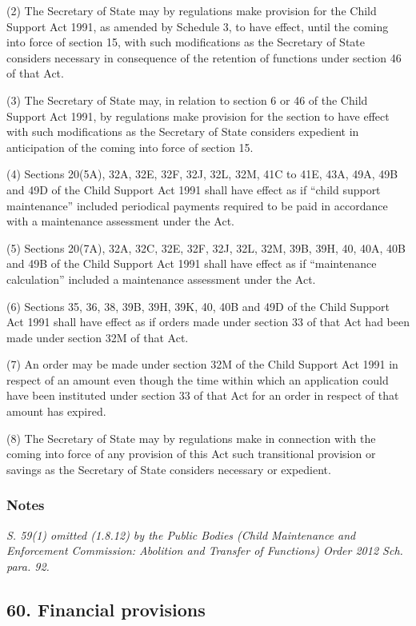 \documentclass[a4paper]{article}
\newcommand\amendment[1]{\subsubsection*{Notes}{\itshape\frenchspacing\footnotesize #1 \par}}
\begin{document}

(2) The Secretary of State may by regulations make provision for the Child Support Act 1991, as amended by Schedule 3, to have effect, until the coming into force of section 15, with such modifications as the Secretary of State considers necessary in consequence of the retention of functions under section 46 of that Act.

(3) The Secretary of State may, in relation to section 6 or 46 of the Child Support Act 1991, by regulations make provision for the section to have effect with such modifications as the Secretary of State considers expedient in anticipation of the coming into force of section 15.

(4) Sections 20(5A), 32A, 32E, 32F, 32J, 32L, 32M, 41C to 41E, 43A, 49A, 49B and 49D of the Child Support Act 1991 shall have effect as if “child support maintenance” included periodical payments required to be paid in accordance with a maintenance assessment under the Act.

(5) Sections 20(7A), 32A, 32C, 32E, 32F, 32J, 32L, 32M, 39B, 39H, 40, 40A, 40B and 49B of the Child Support Act 1991 shall have effect as if “maintenance calculation” included a maintenance assessment under the Act.

(6) Sections 35, 36, 38, 39B, 39H, 39K, 40, 40B and 49D of the Child Support Act 1991 shall have effect as if orders made under section 33 of that Act had been made under section 32M of that Act.

(7) An order may be made under section 32M of the Child Support Act 1991 in respect of an amount even though the time within which an application could have been instituted under section 33 of that Act for an order in respect of that amount has expired.

(8) The Secretary of State may by regulations make in connection with the coming into force of any provision of this Act such transitional provision or savings as the Secretary of State considers necessary or expedient.

\amendment{
S. 59(1) omitted (1.8.12) by the Public Bodies (Child Maintenance and Enforcement Commission: Abolition and Transfer of Functions) Order 2012 Sch. para. 92.
}

\subsection{60. Financial provisions}
\end{document}
